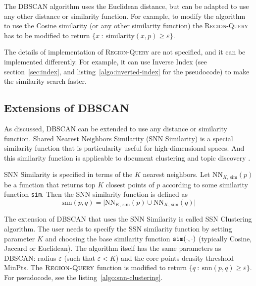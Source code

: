 The DBSCAN algorithm uses the Euclidean distance, 
but can be adapted to use any other distance or similarity function.
For example, to modify the algorithm to use the Cosine similarity 
(or any other similarity function)  
the \textsc{Region-Query} has to be modified to return
$\{ x \ : \ \text{similarity}(x, p) \geqslant \varepsilon \}$.

The details of implementation of \textsc{Region-Query} 
are not specified, and it can be implemented differently. 
For example, it can use Inverse Index (see section~\ref{sec:index}, and listing~\ref{algo:inverted-index} for the pseudocode) 
to make the similarity search faster. 


\subsection{Extensions of DBSCAN} \label{sec:dbscan-ext}

As discussed, DBSCAN can be extended to use any distance or similarity function. 
Shared Nearest Neighbors Similarity (SNN Similarity) \cite{ertoz2003finding} 
is a special similarity function that is particularity useful for 
high-dimensional spaces. 
And this similarity function is applicable to document clustering 
and topic discovery \cite{ertoz2004finding}. 

SNN Similarity is specified in terms of the $K$ nearest neighbors. 
Let $\text{NN}_{K, \, \text{sim}}(p)$ be a function that returns 
top $K$ closest points of $p$ according to some similarity function 
\texttt{sim}. Then the SNN similarity function is  defined as 
$$\text{snn}(p, q) = \big| \text{NN}_{K, \, \text{sim}}(p) \cup \text{NN}_{K, \, \text{sim}}(q) \big|$$


The extension of DBSCAN that uses the SNN Similarity is called 
SSN Clustering algorithm. The user needs to specify the SSN similarity
function by setting parameter $K$ and choosing the base similarity 
function $\text{\texttt{sim}}(\cdot, \cdot)$ (typically Cosine, Jaccard 
or Euclidean). The algorithm itself has the same
parameters as DBSCAN: radius $\varepsilon$ (such that $\varepsilon < K$) 
and the core points density threshold MinPts. The 
$\textsc{Region-Query}$ function is modified to return
$\{ q \ : \ \text{snn}(p, q) \geqslant \varepsilon \}$. For pseudocode, 
see the listing~\ref{algo:snn-clustering}. 

